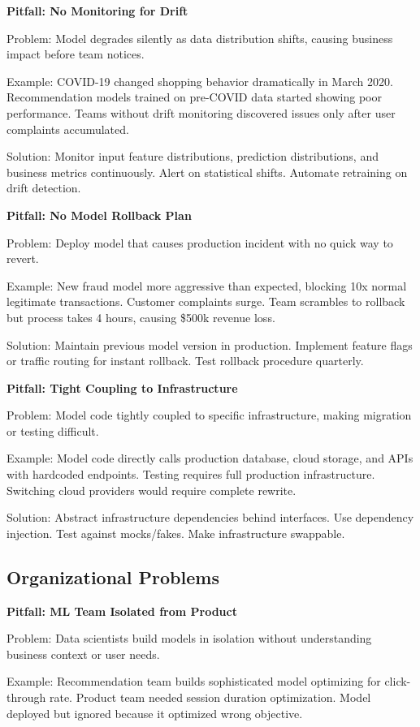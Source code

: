\textbf{Pitfall: No Monitoring for Drift}

Problem: Model degrades silently as data distribution shifts, causing business impact before team notices.

Example: COVID-19 changed shopping behavior dramatically in March 2020. Recommendation models trained on pre-COVID data started showing poor performance. Teams without drift monitoring discovered issues only after user complaints accumulated.

Solution: Monitor input feature distributions, prediction distributions, and business metrics continuously. Alert on statistical shifts. Automate retraining on drift detection.

\textbf{Pitfall: No Model Rollback Plan}

Problem: Deploy model that causes production incident with no quick way to revert.

Example: New fraud model more aggressive than expected, blocking 10x normal legitimate transactions. Customer complaints surge. Team scrambles to rollback but process takes 4 hours, causing \$500k revenue loss.

Solution: Maintain previous model version in production. Implement feature flags or traffic routing for instant rollback. Test rollback procedure quarterly.

\textbf{Pitfall: Tight Coupling to Infrastructure}

Problem: Model code tightly coupled to specific infrastructure, making migration or testing difficult.

Example: Model code directly calls production database, cloud storage, and APIs with hardcoded endpoints. Testing requires full production infrastructure. Switching cloud providers would require complete rewrite.

Solution: Abstract infrastructure dependencies behind interfaces. Use dependency injection. Test against mocks/fakes. Make infrastructure swappable.

\subsection{Organizational Problems}

\textbf{Pitfall: ML Team Isolated from Product}

Problem: Data scientists build models in isolation without understanding business context or user needs.

Example: Recommendation team builds sophisticated model optimizing for click-through rate. Product team needed session duration optimization. Model deployed but ignored because it optimized wrong objective.

